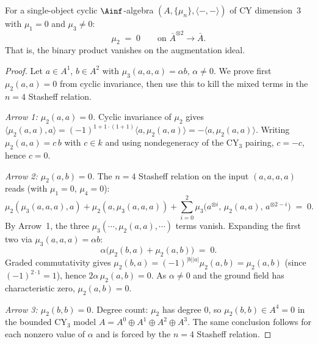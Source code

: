 \begin{theorem}
\label{thm:single-object-incompatibility}
For a single-object cyclic $\Ainf$-algebra
$(A, \{\mu_n\}, \langle -,- \rangle)$ of CY dimension~$3$ with
$\mu_1 = 0$ and $\mu_3 \neq 0$:
\[
 \mu_2 \;=\; 0 \qquad \text{on } \bar A^{\otimes 2} \to \bar A.
\]
That is, the binary product vanishes on the augmentation ideal.
\end{theorem}

\begin{proof}
Let $a \in A^1$, $b \in A^2$ with $\mu_3(a, a, a) = \alpha b$,
$\alpha \neq 0$. We prove first $\mu_2(a, a) = 0$ from cyclic
invariance, then use this to kill the mixed terms in the $n = 4$
Stasheff relation.

\smallskip\noindent\emph{Arrow 1: $\mu_2(a, a) = 0$.}
Cyclic invariance of $\mu_2$ gives
$\langle \mu_2(a, a), a \rangle
= (-1)^{1 + 1 \cdot (1 + 1)}\langle a, \mu_2(a, a) \rangle
= -\langle a, \mu_2(a, a) \rangle$. Writing
$\mu_2(a, a) = c\,b$ with $c \in k$ and using nondegeneracy
of the CY$_3$ pairing, $c = -c$, hence $c = 0$.

\smallskip\noindent\emph{Arrow 2: $\mu_2(a, b) = 0$.}
The $n = 4$ Stasheff relation on the input $(a, a, a, a)$ reads
(with $\mu_1 = 0$, $\mu_4 = 0$):
\[
 \mu_2(\mu_3(a,a,a), a) + \mu_2(a, \mu_3(a,a,a))
 + \sum_{i = 0}^{2}\mu_3\bigl(a^{\otimes i},\, \mu_2(a, a),\, a^{\otimes 2-i}\bigr)
 \;=\; 0.
\]
By Arrow~1, the three $\mu_3(\cdots, \mu_2(a, a), \cdots)$ terms
vanish. Expanding the first two via $\mu_3(a, a, a) = \alpha b$:
\[
 \alpha\bigl(\mu_2(b, a) + \mu_2(a, b)\bigr) \;=\; 0.
\]
Graded commutativity gives $\mu_2(b, a)
= (-1)^{|b||a|}\mu_2(a, b) = \mu_2(a, b)$ (since
$(-1)^{2 \cdot 1} = 1$), hence
$2\alpha\,\mu_2(a, b) = 0$. As $\alpha \neq 0$ and the
ground field has characteristic zero, $\mu_2(a, b) = 0$.

\smallskip\noindent\emph{Arrow 3: $\mu_2(b, b) = 0$.}
Degree count: $\mu_2$ has degree $0$, so
$\mu_2(b, b) \in A^{4} = 0$ in the bounded CY$_3$ model
$A = A^0 \oplus A^1 \oplus A^2 \oplus A^3$.
The same conclusion follows for each nonzero value of $\alpha$ and is
forced by the $n=4$ Stasheff relation.
\end{proof}

